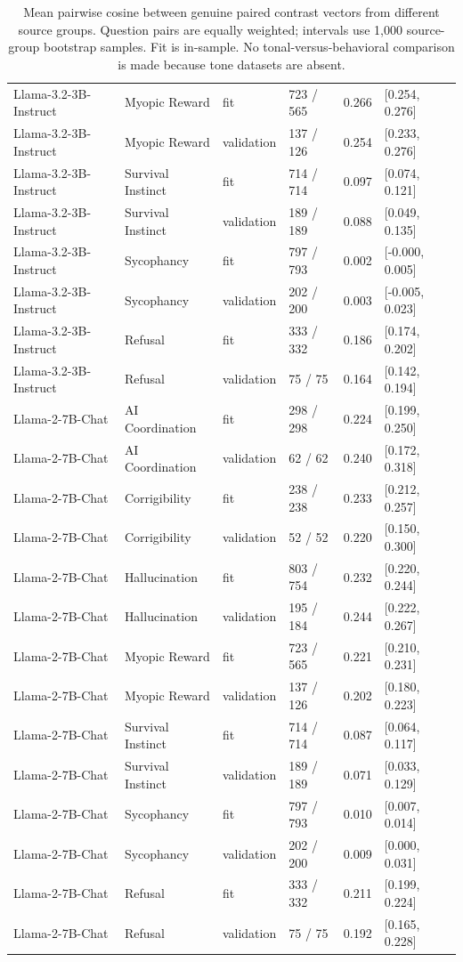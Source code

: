 \begin{table}[t]
{\begin{tabular}{llllll}
Llama-3.2-3B-Instruct & Myopic Reward & fit & 723 / 565 & 0.266 & [0.254, 0.276] \\
Llama-3.2-3B-Instruct & Myopic Reward & validation & 137 / 126 & 0.254 & [0.233, 0.276] \\
Llama-3.2-3B-Instruct & Survival Instinct & fit & 714 / 714 & 0.097 & [0.074, 0.121] \\
Llama-3.2-3B-Instruct & Survival Instinct & validation & 189 / 189 & 0.088 & [0.049, 0.135] \\
Llama-3.2-3B-Instruct & Sycophancy & fit & 797 / 793 & 0.002 & [-0.000, 0.005] \\
Llama-3.2-3B-Instruct & Sycophancy & validation & 202 / 200 & 0.003 & [-0.005, 0.023] \\
Llama-3.2-3B-Instruct & Refusal & fit & 333 / 332 & 0.186 & [0.174, 0.202] \\
Llama-3.2-3B-Instruct & Refusal & validation & 75 / 75 & 0.164 & [0.142, 0.194] \\
Llama-2-7B-Chat & AI Coordination & fit & 298 / 298 & 0.224 & [0.199, 0.250] \\
Llama-2-7B-Chat & AI Coordination & validation & 62 / 62 & 0.240 & [0.172, 0.318] \\
Llama-2-7B-Chat & Corrigibility & fit & 238 / 238 & 0.233 & [0.212, 0.257] \\
Llama-2-7B-Chat & Corrigibility & validation & 52 / 52 & 0.220 & [0.150, 0.300] \\
Llama-2-7B-Chat & Hallucination & fit & 803 / 754 & 0.232 & [0.220, 0.244] \\
Llama-2-7B-Chat & Hallucination & validation & 195 / 184 & 0.244 & [0.222, 0.267] \\
Llama-2-7B-Chat & Myopic Reward & fit & 723 / 565 & 0.221 & [0.210, 0.231] \\
Llama-2-7B-Chat & Myopic Reward & validation & 137 / 126 & 0.202 & [0.180, 0.223] \\
Llama-2-7B-Chat & Survival Instinct & fit & 714 / 714 & 0.087 & [0.064, 0.117] \\
Llama-2-7B-Chat & Survival Instinct & validation & 189 / 189 & 0.071 & [0.033, 0.129] \\
Llama-2-7B-Chat & Sycophancy & fit & 797 / 793 & 0.010 & [0.007, 0.014] \\
Llama-2-7B-Chat & Sycophancy & validation & 202 / 200 & 0.009 & [0.000, 0.031] \\
Llama-2-7B-Chat & Refusal & fit & 333 / 332 & 0.211 & [0.199, 0.224] \\
Llama-2-7B-Chat & Refusal & validation & 75 / 75 & 0.192 & [0.165, 0.228] \\
\bottomrule
\end{tabular}}
\caption{Mean pairwise cosine between genuine paired contrast vectors from different source groups. Question pairs are equally weighted; intervals use 1,000 source-group bootstrap samples. Fit is in-sample. No tonal-versus-behavioral comparison is made because tone datasets are absent.}
\label{tab:cross_prompt_consistency}
\end{table}

